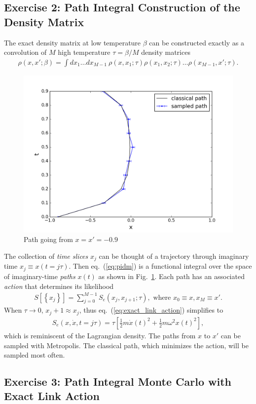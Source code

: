 \documentclass[aps,prl,preprint]{revtex4-1}
\begin{document}
\subsection{Exercise 2: Path Integral Construction of the Density Matrix}

The exact density matrix at low temperature $\beta$ can be constructed exactly as a convolution of $M$ high temperature $\tau=\beta/M$ density matrices
\begin{align}
\rho(x,x';\beta) = \int dx_1\dots dx_{M-1}~ \rho(x,x_1;\tau)\rho(x_1,x_2;\tau)\dots\rho(x_{M-1},x';\tau). \label{eq:pidm}
\end{align}

\begin{figure}[h]
\includegraphics[scale=0.3]{figures/classical_path}
\caption{Path going from $x=x'=-0.9$\label{fig:classical_path}}
\end{figure}

The collection of \emph{time slices} $x_j$ can be thought of a trajectory through imaginary time $x_j\equiv x(t=j\tau)$. Then eq.~(\ref{eq:pidm}) is a functional integral over the space of imaginary-time \emph{paths} $x(t)$ as shown in Fig.~\ref{fig:classical_path}. Each path has an associated \emph{action} that determines its likelihood
\begin{align}
S[\left\{x_j\right\}] = \sum_{j=0}^{M-1} S_e(x_{j},x_{j+1};\tau),\text{ where } x_0\equiv x, x_M\equiv x'.
\end{align}
When $\tau\rightarrow0$, $x_{j}+1\approx x_j$, thus eq.~(\ref{eq:exact_link_action}) simplifies to
\begin{align}
S_e(x,\dot{x},t=j\tau) = \tau \left[ \frac{1}{2}m\dot{x}(t)^2 + \frac{1}{2}m\omega^2x(t)^2 \right],
\end{align}
which is reminiscent of the Lagrangian density. The paths from $x$ to $x'$ can be sampled with Metropolis. The classical path, which minimizes the action, will be sampled most often.

\subsection{Exercise 3: Path Integral Monte Carlo with Exact Link Action}
\end{document}

